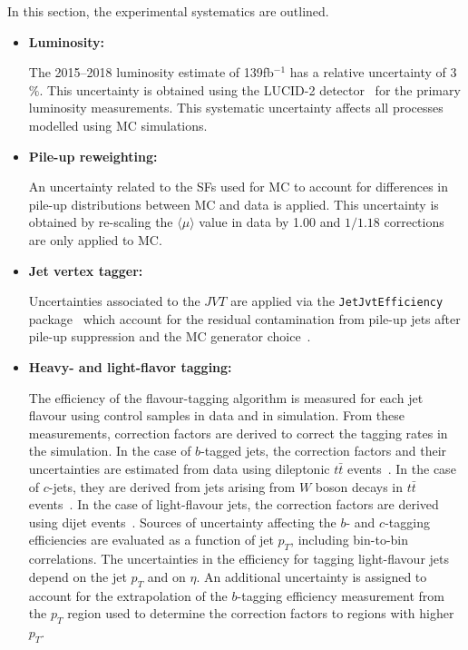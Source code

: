 In this section, the experimental systematics are outlined.

\begin{itemize}
\item \textbf{Luminosity:}

The 2015--2018 luminosity estimate of 139fb$^{-1}$ has a relative uncertainty of 3$\%$. This uncertainty is obtained using
the LUCID-2 detector~\cite{Avoni:2018} for the primary luminosity measurements. This systematic uncertainty affects all processes modelled using MC simulations.


\item \textbf{Pile-up reweighting:}

An uncertainty related to the SFs used for MC to account for differences in pile-up distributions between MC and data is applied.
This uncertainty is obtained by re-scaling the $\langle \mu \rangle$ value in data by \num{1.00} and $1/1.18$ corrections are only applied to MC.


\item \textbf{Jet vertex tagger:}

Uncertainties associated to the $JVT$ are applied via the \texttt{JetJvtEfficiency} package~\cite{twiki-JVT} which account for the
residual contamination from pile-up jets after pile-up suppression and the MC generator choice~\cite{PERF-2016-06}.


\item \textbf{Heavy- and light-flavor tagging:}

The efficiency of the flavour-tagging algorithm is measured for each jet flavour using control samples in data and in simulation. From these
measurements, correction factors are derived to correct the tagging rates in the simulation. In the case of $b$-tagged jets, the correction factors and
their uncertainties are estimated from data using dileptonic $t\bar{t}$ events~\cite{PERF-2016-05,FTAG-2018-01}. In the case of $c$-jets, they are derived from
jets arising from $W$ boson decays in $t\bar{t}$ events~\cite{ATLAS-CONF-2018-001}. In the case of light-flavour jets, the correction factors are derived
using dijet events~\cite{ATLAS-CONF-2018-006}. Sources of uncertainty affecting the $b$- and $c$-tagging efficiencies are evaluated as a function of
jet $p_{T}$, including bin-to-bin correlations. The uncertainties in the efficiency for tagging light-flavour jets depend on the jet $p_{T}$ and on $\eta$.
An additional uncertainty is assigned to account for the extrapolation of the $b$-tagging efficiency measurement from the $p_{T}$ region used
to determine the correction factors to regions with higher $p_{T}$.



\end{itemize}
